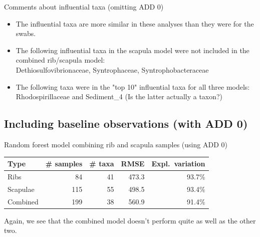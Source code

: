 \documentclass{beamer}
\begin{document}
\begin{frame}{Comments about influential taxa (omitting ADD 0)}
  
  \begin{itemize}
    \item The influential taxa are more similar in these analyses than they were
    for the swabs.
    \item The following influential taxa in the scapula model were not included
    in the combined rib/scapula model:\\
    Dethiosulfovibrionaceae, Syntrophaceae, Syntrophobacteraceae
    \item The following taxa were in the "top 10" influential taxa for all
    three models:\\
    Rhodospirillaceae and Sediment\_4 \quad (Is the latter actually a taxon?) 
  \end{itemize}

\end{frame}




\subsection{Including baseline observations (with ADD 0)}

\begin{frame}{Random forest model combining rib and scapula samples (using ADD 0)}

  \begin{tabular}{lrrrr}
    Type & \# samples & \# taxa & RMSE & Expl.\ variation\\ \hline
    Ribs & 84 & 41 & 473.3 & 93.7\% \\
    Scapulae & 115 & 55 & 498.5 & 93.4\% \\
    Combined & 199 & 38 & 560.9 & 91.4\%
  \end{tabular}
  
  \vspace{0.2in}

  \footnotesize{
    \noindent Again, we see that the combined model doesn't perform quite as
    well as the other two.
  }


\end{frame}
\end{document}
